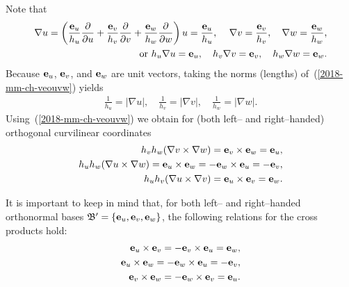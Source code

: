 Note that\cite{chow_2000}
\begin{equation}
\begin{split}
 \nabla  u =
\left(\frac{{\bf e}_u}{h_u}  \frac{\partial  }{\partial u}    +
\frac{{\bf e}_v}{h_v}  \frac{\partial  }{\partial v}      +
\frac{{\bf e}_w}{h_w} \frac{\partial  }{\partial w}\right) u =
 \frac{{\bf e}_u}{h_u} \text{, }\quad
 \nabla  v =  \frac{{\bf e}_v}{h_v}  ,\quad
 \nabla  w =  \frac{{\bf e}_w}{h_w}  \text{,}  \\
 \text{or } h_u \nabla  u =  {\bf e}_u,\quad
h_v \nabla  v =  {\bf e}_v ,\quad
h_w \nabla  w =  {\bf e}_w
.
\end{split}
\label{2018-mm-ch-veouvw}
\end{equation}
%
Because
${\bf e}_u$, ${\bf e}_v$, and ${\bf e}_w$ are unit vectors, taking the norms (lengths)
of~(\ref{2018-mm-ch-veouvw}) yields
\begin{equation}
\begin{split}
\frac{1}{h_u}  = | \nabla  u | ,\quad
\frac{1}{h_v}  = | \nabla  v | ,\quad
\frac{1}{h_w}  = | \nabla  w |
.
\end{split}
\label{2018-mm-ch-veouvwtn}
\end{equation}
%
Using~(\ref{2018-mm-ch-veouvw}) we obtain for
(both left-- and right--handed)
orthogonal curvilinear coordinates
\begin{equation}
\begin{split}
 h_v h_w ( \nabla  v \times \nabla  w ) =
{\bf e}_v \times {\bf e}_w  = {\bf e}_u ,\\
 h_u h_w ( \nabla  u \times \nabla  w ) =
{\bf e}_u \times {\bf e}_w  =
- {\bf e}_w \times {\bf e}_u  =
- {\bf e}_v ,                                 \\
 h_u h_v ( \nabla  u \times \nabla  v ) =
{\bf e}_u \times {\bf e}_v  =
{\bf e}_w
.
\end{split}
\label{2018-mm-ch-veouvwtnex}
\end{equation}


It is important to keep in mind that,
for both left-- and right--handed orthonormal bases
${\frak B}'=\{
{\bf e}_u,
{\bf e}_v,
{\bf e}_w
\}$, the following  relations for the cross products hold:
\begin{equation}
\begin{split}
{\bf e}_u \times {\bf e}_v  =
- {\bf e}_v \times {\bf e}_u
= {\bf e}_w
,\\
{\bf e}_u \times {\bf e}_w   =
- {\bf e}_w \times {\bf e}_u
= - {\bf e}_v
, \\
{\bf e}_v \times {\bf e}_w    =
- {\bf e}_w \times {\bf e}_v
= {\bf e}_u
.
\end{split}
\end{equation}


